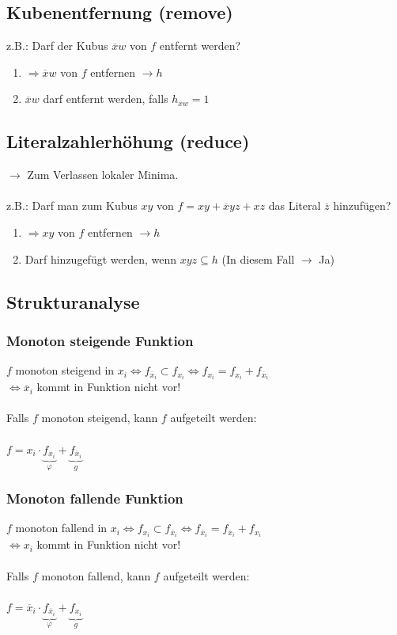 \documentclass[a4paper,twocolumn,10pt]{article}
\begin{document}
\subsection*{Kubenentfernung (remove)}
z.B.: Darf der Kubus $\overline{x}w$ von $f$ entfernt werden?
\begin{enumerate}
	\item $\Rightarrow \overline{x}w$ von $f$ entfernen $\rightarrow h$
	\item $\overline{x}w$ darf entfernt werden, falls $h_{\overline{x}w}=1$
\end{enumerate}

\subsection*{Literalzahlerhöhung (reduce)}
$\rightarrow$ Zum Verlassen lokaler Minima.\\\\
z.B.: Darf man zum Kubus $xy$ von $f=xy+\overline{x}yz+xz$ das Literal $\overline{z}$ hinzufügen?
\begin{enumerate}
	\item $\Rightarrow xy$ von $f$ entfernen $\rightarrow h$
	\item Darf hinzugefügt werden, wenn $xyz \subseteq h$ (In diesem Fall $\rightarrow$ Ja)
\end{enumerate}

\subsection*{Strukturanalyse}
\subsubsection*{Monoton steigende Funktion}
$f$ monoton steigend in $x_i \Leftrightarrow f_{\overline{x}_i} \subset f_{x_i}\Leftrightarrow f_{x_i}=f_{x_i}+f_{\overline{x}_i}$\\
$\Leftrightarrow \overline{x}_i$ kommt in Funktion nicht vor!\\\\
Falls $f$ monoton steigend, kann $f$ aufgeteilt werden:\\\\
$f=x_i\cdot \underbrace{f_{x_i}}_{\varphi}+\underbrace{f_{\overline{x}_i}}_{g}$

\subsubsection*{Monoton fallende Funktion}
$f$ monoton fallend in $x_i \Leftrightarrow f_{x_i} \subset f_{\overline{x}_i}\Leftrightarrow f_{\overline{x}_i}=f_{\overline{x}_i}+f_{x_i}$\\
$\Leftrightarrow x_i$ kommt in Funktion nicht vor!\\\\
Falls $f$ monoton fallend, kann $f$ aufgeteilt werden:\\\\
$f=\overline{x}_i\cdot \underbrace{f_{\overline{x}_i}}_{\varphi}+\underbrace{f_{{x}_i}}_{g}$
\end{document}

